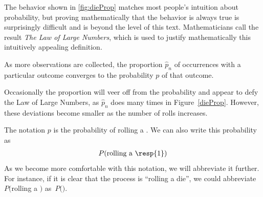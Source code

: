 The behavior shown in \ref{fig:dieProp} matches most people's intuition about probability, but proving mathematically that the behavior is always true is surprisingly difficult and is beyond the level of this text.  Mathematicians call the result \textit{The Law of Large Numbers}, which is used to justify mathematically this intuitively appealing definition.


\begin{termBox}{
As more observations are collected, the proportion $\hat{p}_n$ of occurrences with a particular outcome converges to the probability $p$ of that outcome.}
\end{termBox}

Occasionally the proportion will veer off from the probability and appear to defy the Law of Large Numbers, as $\hat{p}_n$ does many times in Figure~\ref{dieProp}. However, these deviations become smaller as the number of rolls increases.

The notation $p$ is the probability of rolling a . We can also write this probability as
\begin{eqnarray*}
P(\text{rolling a \resp{1}})
\end{eqnarray*}
As we become more comfortable with this notation, we will abbreviate it further. For instance, if it is clear that the process is ``rolling a die'', we could abbreviate $P($rolling a $)$ as~$P($$)$. 


